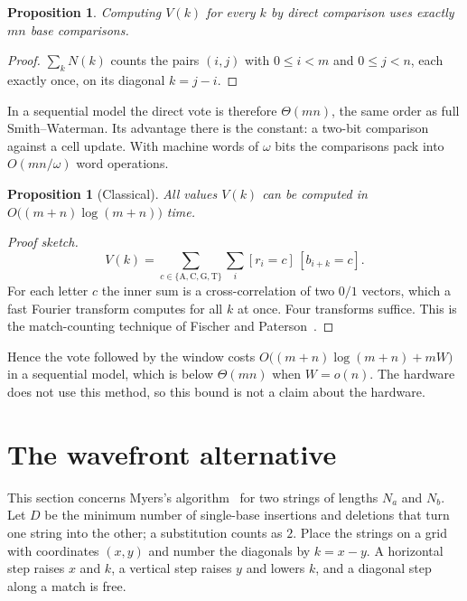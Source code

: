 \documentclass[11pt]{article}
\theoremstyle{plain}
\newtheorem{proposition}[theorem]{Proposition}
\theoremstyle{definition}
\theoremstyle{remark}
\begin{document}
\begin{proposition}\label{prop:votecost}
Computing $V(k)$ for every $k$ by direct comparison uses exactly $mn$ base
comparisons.
\end{proposition}

\begin{proof}
$\sum_k N(k)$ counts the pairs $(i,j)$ with $0 \le i < m$ and $0 \le j < n$,
each exactly once, on its diagonal $k = j - i$.
\end{proof}

In a sequential model the direct vote is therefore $\Theta(mn)$, the same order
as full Smith--Waterman. Its advantage there is the constant: a two-bit
comparison against a cell update. With machine words of $\omega$ bits the
comparisons pack into $O(mn/\omega)$ word operations.

\begin{proposition}[Classical]\label{prop:fft}
All values $V(k)$ can be computed in $O\bigl((m+n)\log(m+n)\bigr)$ time.
\end{proposition}

\begin{proof}[Proof sketch]
\[
V(k) = \sum_{c \in \{\mathrm{A},\mathrm{C},\mathrm{G},\mathrm{T}\}}
       \sum_{i} [r_i = c]\,[b_{i+k} = c].
\]
For each letter $c$ the inner sum is a cross-correlation of two $0/1$ vectors,
which a fast Fourier transform computes for all $k$ at once. Four transforms
suffice. This is the match-counting technique of Fischer and
Paterson~\cite{fischer1974}.
\end{proof}

Hence the vote followed by the window costs $O\bigl((m+n)\log(m+n) + mW\bigr)$
in a sequential model, which is below $\Theta(mn)$ when $W = o(n)$. The hardware
does not use this method, so this bound is not a claim about the hardware.

\section{The wavefront alternative}

This section concerns Myers's algorithm~\cite{myers1986} for two strings of
lengths $N_a$ and $N_b$. Let $D$ be the minimum number of single-base insertions
and deletions that turn one string into the other; a substitution counts as $2$.
Place the strings on a grid with coordinates $(x,y)$ and number the diagonals by
$k = x - y$. A horizontal step raises $x$ and $k$, a vertical step raises $y$
and lowers $k$, and a diagonal step along a match is free.
\end{document}
